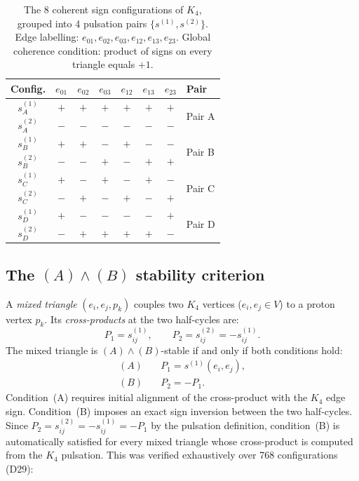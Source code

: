\documentclass[12pt,a4paper]{article}
\begin{document}
\begin{table}[ht]
\centering
\caption{The 8 coherent sign configurations of $K_4$, grouped into 4 pulsation pairs
$\{s^{(1)}, s^{(2)}\}$. Edge labelling: $e_{01}, e_{02}, e_{03}, e_{12}, e_{13}, e_{23}$.
Global coherence condition: product of signs on every triangle equals $+1$.}
\label{tab:K4configs}
\begin{tabular}{cccccccl}
\toprule
Config. & $e_{01}$ & $e_{02}$ & $e_{03}$ & $e_{12}$ & $e_{13}$ & $e_{23}$ & Pair \\
\midrule
$s^{(1)}_A$ & $+$ & $+$ & $+$ & $+$ & $+$ & $+$ & \multirow{2}{*}{Pair A} \\
$s^{(2)}_A$ & $-$ & $-$ & $-$ & $-$ & $-$ & $-$ & \\
\midrule
$s^{(1)}_B$ & $+$ & $+$ & $-$ & $+$ & $-$ & $-$ & \multirow{2}{*}{Pair B} \\
$s^{(2)}_B$ & $-$ & $-$ & $+$ & $-$ & $+$ & $+$ & \\
\midrule
$s^{(1)}_C$ & $+$ & $-$ & $+$ & $-$ & $+$ & $-$ & \multirow{2}{*}{Pair C} \\
$s^{(2)}_C$ & $-$ & $+$ & $-$ & $+$ & $-$ & $+$ & \\
\midrule
$s^{(1)}_D$ & $+$ & $-$ & $-$ & $-$ & $-$ & $+$ & \multirow{2}{*}{Pair D} \\
$s^{(2)}_D$ & $-$ & $+$ & $+$ & $+$ & $+$ & $-$ & \\
\bottomrule
\end{tabular}
\end{table}

\subsection{The \texorpdfstring{$(A)\wedge(B)$}{(A)∧(B)} stability criterion}
\label{subsec:AB}

A \emph{mixed triangle} $(e_i, e_j, p_k)$ couples two $K_4$ vertices ($e_i, e_j \in V$)
to a proton vertex $p_k$. Its \emph{cross-products} at the two half-cycles are:
\begin{equation}
P_1 = s^{(1)}_{ij}, \qquad P_2 = s^{(2)}_{ij} = -s^{(1)}_{ij}.
\label{eq:crossproducts}
\end{equation}
The mixed triangle is $(A)\wedge(B)$-stable if and only if both conditions hold:
\begin{align}
(A) &\quad P_1 = s^{(1)}(e_i, e_j), \label{eq:condA} \\
(B) &\quad P_2 = -P_1. \label{eq:condB}
\end{align}
Condition~(A) requires initial alignment of the cross-product with the $K_4$ edge sign.
Condition~(B) imposes an exact sign inversion between the two half-cycles. Since
$P_2 = s^{(2)}_{ij} = -s^{(1)}_{ij} = -P_1$ by the pulsation definition, condition~(B)
is automatically satisfied for every mixed triangle whose cross-product is computed from
the $K_4$ pulsation. This was verified exhaustively over 768 configurations (D29):
\end{document}
